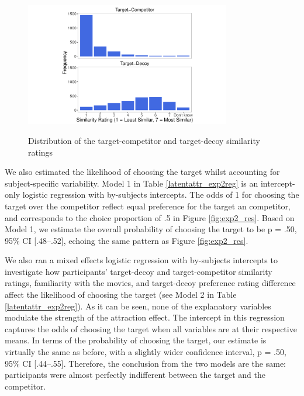 \documentclass[12pt, a4paper]{article}
\begin{document}
\begin{figure}[htb!]
\centering
\captionsetup{justification=centering}
		\caption{Distribution of the target-competitor and target-decoy similarity ratings}
\includegraphics[width=0.8\textwidth]{figure5.pdf}
\label{fig:exp2_similarityratings}
\end{figure}

We also estimated the likelihood of choosing the target whilst accounting for subject-specific variability. Model 1 in Table \ref{latentattr_exp2reg} is an intercept-only logistic regression with by-subjects intercepts. The odds of 1 for choosing the target over the competitor reflect equal preference for the target an competitor, and corresponds to the choice proportion of .5 in Figure \ref{fig:exp2_res}. Based on Model 1, we estimate the overall probability of choosing the target to be p = .50, 95\% CI [.48--.52], echoing the same pattern as Figure \ref{fig:exp2_res}. 

We also ran a mixed effects logistic regression with by-subjects intercepts to investigate how participants' target-decoy and target-competitor similarity ratings, familiarity with the movies, and target-decoy preference rating difference affect the likelihood of choosing the target (see Model 2 in Table \ref{latentattr_exp2reg}). As it can be seen, none of the explanatory variables modulate the strength of the attraction effect. The intercept in this regression captures the odds of choosing the target when all variables are at their respective means. In terms of the probability of choosing the target, our estimate is virtually the same as before, with a slightly wider confidence interval, p = .50, 95\% CI [.44--.55]. Therefore, the conclusion from the two models are the same: participants were almost perfectly indifferent between the target and the competitor. 
\end{document}
